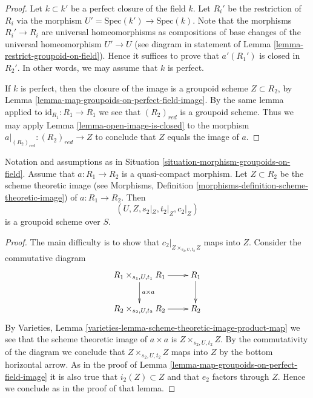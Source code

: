 \begin{proof}
Let $k \subset k'$ be a perfect closure of the field $k$.
Let $R_i'$ be the restriction of $R_i$ via the morphism
$U' = \text{Spec}(k') \to \text{Spec}(k)$. Note that the
morphisms $R_i' \to R_i$ are universal homeomorphisms as
compositions of base changes of the universal homeomorphism
$U' \to U$ (see diagram in statement of
Lemma \ref{lemma-restrict-groupoid-on-field}).
Hence it suffices to prove that $a'(R_1')$ is closed
in $R_2'$. In other words, we may assume that $k$ is perfect.

\medskip\noindent
If $k$ is perfect, then the closure of the image is
a groupoid scheme $Z \subset R_2$, by
Lemma \ref{lemma-map-groupoids-on-perfect-field-image}.
By the same lemma applied to
$\text{id}_{R_1} : R_1 \to R_1$
we see that $(R_2)_{red}$ is a groupoid scheme.
Thus we may apply
Lemma \ref{lemma-open-image-is-closed}
to the morphism
$a|_{(R_2)_{red}} : (R_2)_{red} \to Z$
to conclude that $Z$ equals the image of $a$.
\end{proof}

\begin{lemma}
\label{lemma-quasi-compact-map-groupoids-on-field-image}
Notation and assumptions as in
Situation \ref{situation-morphism-groupoids-on-field}.
Assume that $a : R_1 \to R_2$ is a quasi-compact morphism.
Let $Z \subset R_2$ be the scheme theoretic image (see
Morphisms, Definition \ref{morphisms-definition-scheme-theoretic-image})
of $a : R_1 \to R_2$. Then
$$
(U, Z, s_2|_Z, t_2|_Z, c_2|_Z)
$$
is a groupoid scheme over $S$.
\end{lemma}

\begin{proof}
The main difficulty is to show that $c_2|_{Z \times_{s_2, U, t_2} Z}$
maps into $Z$. Consider the commutative diagram
$$
\xymatrix{
R_1 \times_{s_1, U, t_1} R_1 \ar[r] \ar[d]^{a \times a} & R_1 \ar[d] \\
R_2 \times_{s_2, U, t_2} R_2 \ar[r] & R_2
}
$$
By
Varieties, Lemma \ref{varieties-lemma-scheme-theoretic-image-product-map}
we see that the scheme theoretic image of $a \times a$ is
$Z \times_{s_2, U, t_2} Z$. By the commutativity of the diagram we
conclude that $Z \times_{s_2, U, t_2} Z$ maps into $Z$ by the bottom
horizontal arrow. As in the proof of
Lemma \ref{lemma-map-groupoids-on-perfect-field-image}
it is also true that $i_2(Z) \subset Z$ and that
$e_2$ factors through $Z$. Hence we conclude as in the
proof of that lemma.
\end{proof}


